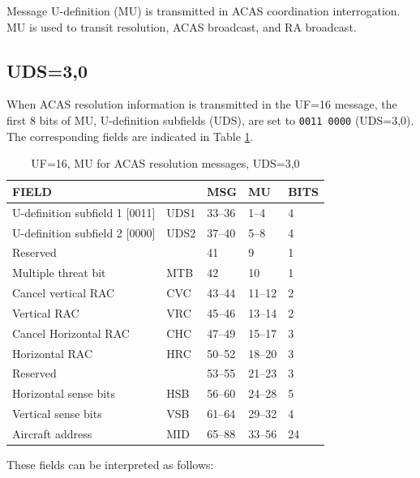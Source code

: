 Message U-definition (MU) is transmitted in ACAS coordination interrogation. MU is used to transit resolution, ACAS broadcast, and RA broadcast.


\subsection{UDS=3,0}

When ACAS resolution information is transmitted in the UF=16 message, the first 8 bits of MU, U-definition subfields (UDS), are set to \texttt{0011 0000} (UDS=3,0). The corresponding fields are indicated in Table \ref{tb:acas_mu_uds30}.

\begin{table}[ht]
\caption{UF=16, MU for ACAS resolution messages, UDS=3,0}
\label{tb:acas_mu_uds30}
\begin{tabular}{|l|l|l|l|l|}
\hline
\textbf{FIELD} & \textbf{} & \textbf{MSG} & \textbf{MU} & \textbf{BITS} \\ \hline
U-definition subfield 1 [0011] & UDS1 & 33--36 & 1--4 & 4 \\ \hline
U-definition subfield 2 [0000] & UDS2 & 37--40 & 5--8 & 4 \\ \hline
Reserved &  & 41 & 9 & 1 \\ \hline
Multiple threat bit & MTB & 42 & 10 & 1 \\ \hline
Cancel vertical RAC & CVC & 43--44 & 11--12 & 2 \\ \hline
Vertical RAC & VRC & 45--46 & 13--14 & 2 \\ \hline
Cancel Horizontal RAC & CHC & 47--49 & 15--17 & 3 \\ \hline
Horizontal RAC & HRC & 50--52 & 18--20 & 3 \\ \hline
Reserved &  & 53--55 & 21--23 & 3 \\ \hline
Horizontal sense bits & HSB & 56--60 & 24--28 & 5 \\ \hline
Vertical sense bits & VSB & 61--64 & 29--32 & 4 \\ \hline
Aircraft address & MID & 65--88 & 33--56 & 24 \\ \hline
\end{tabular}
\end{table}

These fields can be interpreted as follows:

